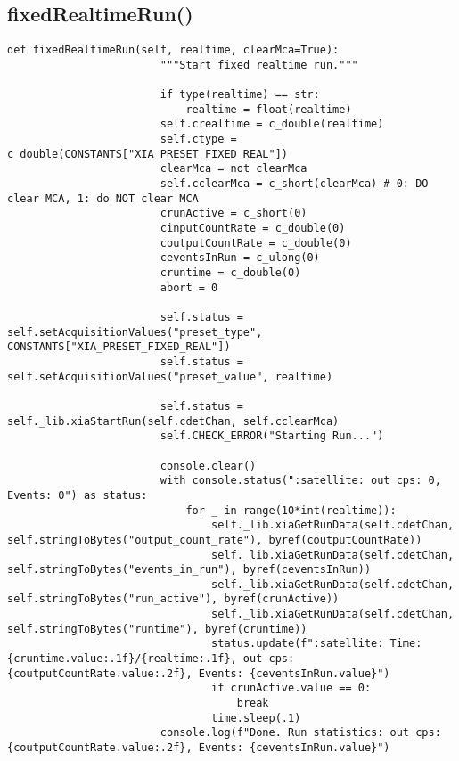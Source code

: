             \subsection{fixedRealtimeRun()}
                \begin{lstlisting}[style=mypython, firstnumber=224, caption={[XMagix method fixedRealtimeRun()]XMagix method fixedRealtimeRun().}, label={lst:xmagix fixedRealtimeRun}, gobble=16]
                    def fixedRealtimeRun(self, realtime, clearMca=True):
                        """Start fixed realtime run."""
                
                        if type(realtime) == str:
                            realtime = float(realtime)
                        self.crealtime = c_double(realtime)
                        self.ctype = c_double(CONSTANTS["XIA_PRESET_FIXED_REAL"])
                        clearMca = not clearMca
                        self.cclearMca = c_short(clearMca) # 0: DO clear MCA, 1: do NOT clear MCA
                        crunActive = c_short(0)
                        cinputCountRate = c_double(0)
                        coutputCountRate = c_double(0)
                        ceventsInRun = c_ulong(0)
                        cruntime = c_double(0)
                        abort = 0
                
                        self.status = self.setAcquisitionValues("preset_type", CONSTANTS["XIA_PRESET_FIXED_REAL"])
                        self.status = self.setAcquisitionValues("preset_value", realtime)
                
                        self.status = self._lib.xiaStartRun(self.cdetChan, self.cclearMca)
                        self.CHECK_ERROR("Starting Run...")
                
                        console.clear()
                        with console.status(":satellite: out cps: 0, Events: 0") as status:
                            for _ in range(10*int(realtime)):
                                self._lib.xiaGetRunData(self.cdetChan, self.stringToBytes("output_count_rate"), byref(coutputCountRate))
                                self._lib.xiaGetRunData(self.cdetChan, self.stringToBytes("events_in_run"), byref(ceventsInRun))
                                self._lib.xiaGetRunData(self.cdetChan, self.stringToBytes("run_active"), byref(crunActive))
                                self._lib.xiaGetRunData(self.cdetChan, self.stringToBytes("runtime"), byref(cruntime))
                                status.update(f":satellite: Time: {cruntime.value:.1f}/{realtime:.1f}, out cps: {coutputCountRate.value:.2f}, Events: {ceventsInRun.value}")
                                if crunActive.value == 0:
                                    break
                                time.sleep(.1)
                        console.log(f"Done. Run statistics: out cps: {coutputCountRate.value:.2f}, Events: {ceventsInRun.value}")
                \end{lstlisting}

